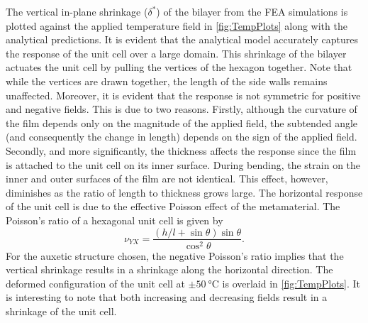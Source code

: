 \documentclass[final,times,5p]{elsarticle}
\numberwithin{equation}{section}
\begin{document}
The vertical in-plane shrinkage ($\delta^*$) of the bilayer from the FEA simulations is plotted against the applied temperature field in \cref{fig:TempPlots} along with the analytical predictions. It is evident that the analytical model accurately captures the response of the unit cell over a large domain. This shrinkage of the bilayer actuates the unit cell by pulling the vertices of the hexagon together. Note that while the vertices are drawn together, the length of the side walls remains unaffected. Moreover, it is evident that the response is not symmetric for positive and negative fields. This is due to two reasons. Firstly, although the curvature of the film depends only on the magnitude of the applied field, the subtended angle (and consequently the change in length) depends on the sign of the applied field. Secondly, and more significantly, the thickness affects the response since the film is attached to the unit cell on its inner surface. During bending, the strain on the inner and outer surfaces of the film are not identical. This effect, however, diminishes as the ratio of length to thickness grows large.
%
The horizontal response of the unit cell is due to the effective Poisson effect of the metamaterial. The Poisson's ratio of a hexagonal unit cell is given by \citep{gibson_ashby_1997}
\begin{equation}\nu_{YX}=\frac{(h/l+\sin{\theta})\sin{\theta}}{\cos^2{\theta}}.
\end{equation}
For the auxetic structure chosen, the negative Poisson's ratio implies that the vertical shrinkage results in a shrinkage along the horizontal direction. The deformed configuration of the unit cell at $\pm \SI{50}{\degreeCelsius}$ is overlaid in \cref{fig:TempPlots}. It is interesting to note that both increasing and decreasing fields result in a shrinkage of the unit cell.

\end{document}
